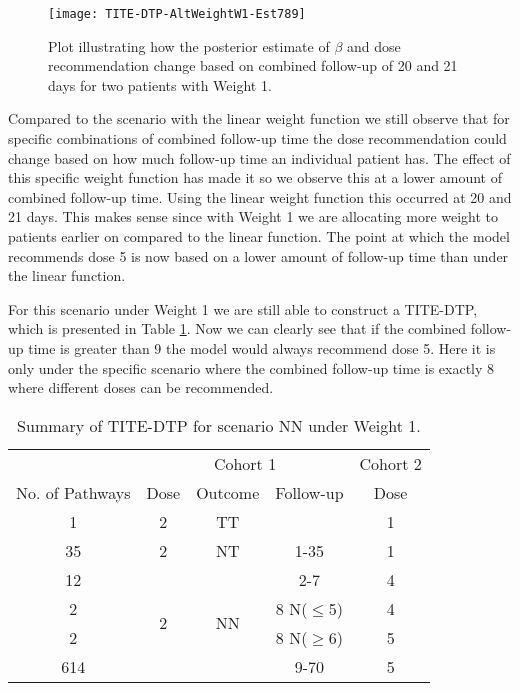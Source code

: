 \begin{figure}[h!]
	\centering
	\caption[Changes in $\beta$ based on combined follow-up of 7/8/9 days for two patients with Weight 1.]{Plot illustrating how the posterior estimate of $\beta$ and dose recommendation change based on combined follow-up of 20 and 21 days for two patients with Weight 1.}
	\label{fig_tite-dtp:AltWeightW1Est789}
	\texttt{[image: TITE-DTP-AltWeightW1-Est789]}
\end{figure}

Compared to the scenario with the linear weight function we still observe that for specific combinations of combined follow-up time the dose recommendation could change based on how much follow-up time an individual patient has. The effect of this specific weight function has made it so we observe this at a lower amount of combined follow-up time. Using the linear weight function this occurred at 20 and 21 days. This makes sense since with Weight 1 we are allocating more weight to patients earlier on compared to the linear function. The point at which the model recommends dose 5 is now based on a lower amount of follow-up time than under the linear function. 
  
For this scenario under Weight 1 we are still able to construct a TITE-DTP, which is presented in Table \ref{tab_tite-dtp:AltweightW1DTP}. Now we can clearly see that if the combined follow-up time is greater than 9 the model would always recommend dose 5. Here it is only under the specific scenario where the combined follow-up time is exactly 8 where different doses can be recommended.  

\begin{table}[H]
	\centering
	\caption{Summary of TITE-DTP for scenario NN under Weight 1.}
	\label{tab_tite-dtp:AltweightW1DTP}
	\begin{tabular}{ccccc}
		\hline
		\multicolumn{1}{l}{} &                 \multicolumn{3}{c}{Cohort 1}    & Cohort 2 \\ 
		\cmidrule(l{3pt}r{3pt}){2-4} \cmidrule(l{3pt}r{3pt}){5-5}
		No. of Pathways   & Dose  				& Outcome             & Follow-up 		& Dose     \\ \hline
		1                 & 2               	& TT                  &          		& 1        \\ \hline
		35                & 2            		& NT                  & 1-35      		& 1        \\ \hline
		12   			  & \multirow{4}{*}{2}  & \multirow{4}{*}{NN} & 2-7      		& 4        \\
		2				  &                		&                     & 8 N($\leq$5)    & 4        \\
		2				  &                		&                     & 8 N($\geq$6)    & 5        \\
		614				  &              		&                     & 9-70     		& 5        \\ \hline
	\end{tabular}
\end{table}

